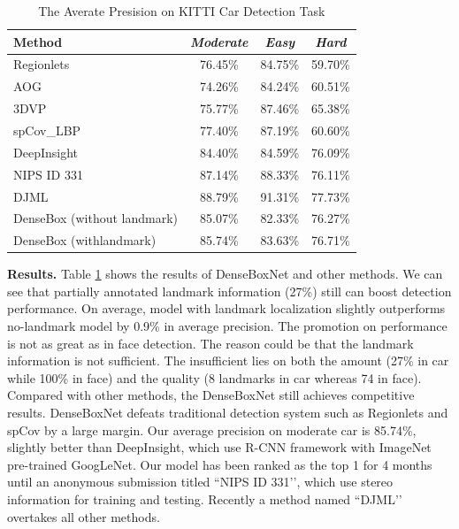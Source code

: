 	\renewcommand{\arraystretch}{1.5}
	\begin{table}[!hbt]
	\centering
	\begin{tabular}{|l|c|c|c|}
	\hline

	Method & \textit{Moderate} &\textit{Easy} & \textit{Hard}\\
	\hline
	Regionlets~\cite{long2015accurate}	 &76.45\%	  &84.75\%	  &59.70\% 	 \\ 
	AOG~\cite{li2014integrating}	&74.26\%	&84.24\% 		&60.51\% \\
	3DVP~\cite{xiang2015data}			&75.77\%	&87.46\%	&65.38\%       \\
	spCov\_LBP 	&77.40\%	&87.19\%	&60.60\%   \\
	DeepInsight	&84.40\%	&84.59\%	&76.09\%     \\
	NIPS ID 331	&87.14\%	&88.33\%	&76.11\% \\
	DJML	&88.79\%	&91.31\%	&77.73\% \\
	\hline
	
	\hline
	DenseBox (without landmark)	&85.07\%	&82.33\%	&76.27\%   \\
	DenseBox (withlandmark)		&85.74\%	&83.63\%	&76.71\%     \\
 

	\hline
	\end{tabular}
	\caption{The Averate Presision on KITTI Car Detection Task} 
	\label{tab:tab_kitti}
	\end{table}
\textbf{Results.} Table \ref{tab:tab_kitti} shows the results of DenseBoxNet and other methods. We can see that partially annotated landmark information (27\%) still can boost detection performance. On average, model with landmark localization slightly outperforms no-landmark model by 0.9\% in average precision.  The promotion on performance is not as great as in face detection.  The reason could be that the landmark information is not sufficient.  The insufficient lies on both the amount (27\% in car while 100\% in face) and the quality (8 landmarks in car whereas 74 in face). Compared with other methods, the DenseBoxNet still achieves competitive results.  DenseBoxNet defeats traditional detection system such as Regionlets and spCov by a large margin. Our average precision on moderate car is 85.74\%, slightly better than DeepInsight, which use R-CNN framework with ImageNet pre-trained GoogLeNet\cite{szegedy2014going}.  Our model has been ranked as the top 1 for 4 months until an anonymous submission titled  ``NIPS ID 331’’, which use stereo information for training and testing. Recently a method named ``DJML’’ overtakes all other methods. 


